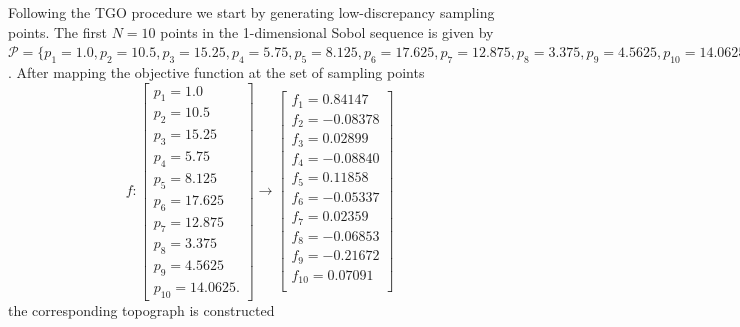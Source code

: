 Following the TGO procedure we start by generating low-discrepancy sampling points. The first $N = 10$ points in the 1-dimensional Sobol sequence is given by
$\mathcal{P} = \{
   p_{1}   =   1.0,  
   p_{2}   =   10.5,    
   p_{3}   =   15.25,   
   p_{4}   =   5.75,
   p_{5}   =   8.125,   
   p_{6}   =   17.625,    
   p_{7}   =   12.875, 
   p_{8}   =   3.375,   
   p_{9}   =   4.5625,   
   p_{10}   =   14.0625 \} \subset \Omega $.
After mapping the objective function at the set of sampling points    
\begin{equation}
f:
\begin{bmatrix}
   p_{1}   =   1.0 \\  
   p_{2}   =   10.5\\    
   p_{3}   =   15.25\\   
   p_{4}   =   5.75\\
   p_{5}   =   8.125\\   
   p_{6}   =   17.625\\    
   p_{7}   =   12.875\\ 
   p_{8}   =   3.375\\   
   p_{9}   =   4.5625\\   
   p_{10}   =   14.0625.
\end{bmatrix}
\rightarrow
\begin{bmatrix}
   f_{1}   =    0.84147\\
   f_{2}   =   -0.08378\\
   f_{3}   =    0.02899\\
   f_{4}   =   -0.08840\\
   f_{5}   =    0.11858\\
   f_{6}   =   -0.05337\\
   f_{7}   =    0.02359\\
   f_{8}   =   -0.06853\\
   f_{9}   =   -0.21672\\
   f_{10}   =   0.07091\\
\end{bmatrix}
\end{equation}
the corresponding topograph is constructed
